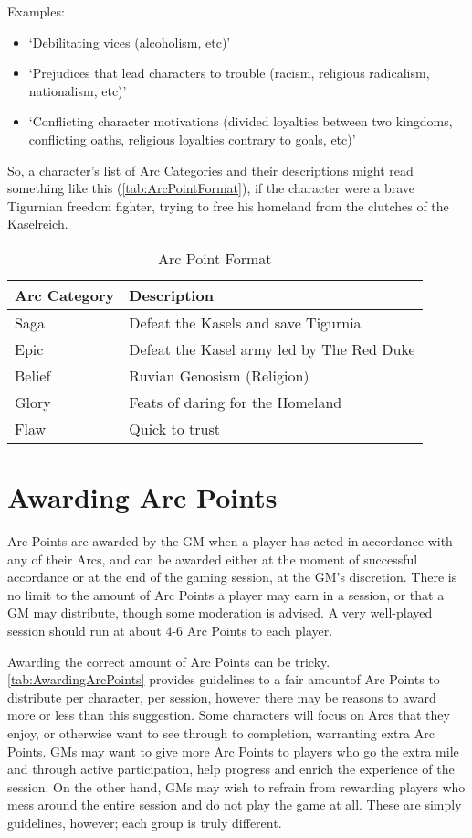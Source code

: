 \documentclass[oneside,11pt,english]{book}
\begin{document}
Examples:
\begin{itemize}
\item ‘Debilitating vices (alcoholism, etc)’ 
\item ‘Prejudices that lead characters to trouble (racism, religious radicalism, nationalism, etc)’ 
\item ‘Conflicting character motivations (divided loyalties between two kingdoms, conflicting oaths, 
  religious loyalties contrary to goals, etc)’ 
\end{itemize}
So, a character’s list of Arc Categories and their descriptions might read
something like this (\autoref{tab:ArcPointFormat}), if the character were a
brave Tigurnian freedom fighter, trying to free his homeland from the clutches
of the Kaselreich.
\begin{table}[!ht]
  \centering
  \caption{Arc Point Format}
  \label{tab:ArcPointFormat}
  \begin{tabu} spread 0pt{X[-1,c]X}
    Arc Category & Description                               \\\toprule
    Saga         & Defeat the Kasels and save Tigurnia       \\
    Epic         & Defeat the Kasel army led by The Red Duke \\
    Belief       & Ruvian Genosism (Religion)                \\
    Glory        & Feats of daring for the Homeland          \\
    Flaw         & Quick to trust                            \\
  \end{tabu}
\end{table}

\section{Awarding Arc Points} 
Arc Points are awarded by the GM when a player has acted in accordance with any
of their Arcs, and can be awarded either at the moment of successful accordance
or at the end of the gaming session, at the GM’s discretion. There is no limit
to the amount of Arc Points a player may earn in a session, or that a GM may
distribute, though some moderation is advised. A very well-played session should
run at about 4-6 Arc Points to each player.

Awarding the correct amount of Arc Points can be tricky.
\autoref{tab:AwardingArcPoints} provides guidelines to a fair amountof Arc
Points to distribute per character, per session, however there may be reasons to
award more or less than this suggestion. Some characters will focus on Arcs that
they enjoy, or otherwise want to see through to completion, warranting extra Arc
Points. GMs may want to give more Arc Points to players who go the extra mile
and through active participation, help progress and enrich the experience of the
session. On the other hand, GMs may wish to refrain from rewarding players who
mess around the entire session and do not play the game at all. These are simply
guidelines, however; each group is truly different.  
\end{document}

